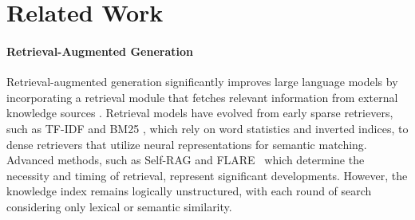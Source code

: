 \section{Related Work} 
\label{sec:RelatedWork}
\paragraph{Retrieval-Augmented Generation}
Retrieval-augmented generation significantly improves large language models by incorporating a retrieval module that fetches relevant information from external knowledge sources \citep{EaE, REALM, FID, survey, yu2025mramg}. Retrieval models have evolved from early sparse retrievers, such as TF-IDF \citep{TF-IDF} and BM25 \citep{BM25}, which rely on word statistics and inverted indices, to dense retrievers \citep{2020RAG} that utilize neural representations for semantic matching. Advanced methods, such as Self-RAG \citep{Self-RAG} and FLARE~\citep{FLARE} which determine the necessity and timing of retrieval, represent significant developments. However, the knowledge index remains logically unstructured, with each round of search considering only lexical or semantic similarity.



